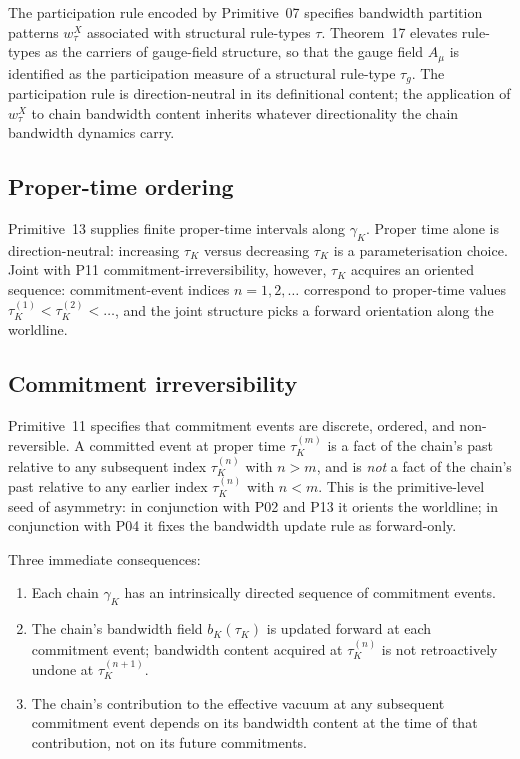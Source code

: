 \documentclass[11pt,a4paper]{article}
\begin{document}
The participation rule encoded by Primitive~07 specifies bandwidth partition patterns $w_\tau^X$ associated with structural rule-types $\tau$. Theorem~17 elevates rule-types as the carriers of gauge-field structure, so that the gauge field $A_\mu$ is identified as the participation measure of a structural rule-type $\tau_g$. The participation rule is direction-neutral in its definitional content; the application of $w_\tau^X$ to chain bandwidth content inherits whatever directionality the chain bandwidth dynamics carry.

\subsection{Proper-time ordering}

Primitive~13 supplies finite proper-time intervals along $\gamma_K$. Proper time alone is direction-neutral: increasing $\tau_K$ versus decreasing $\tau_K$ is a parameterisation choice. Joint with P11 commitment-irreversibility, however, $\tau_K$ acquires an oriented sequence: commitment-event indices $n = 1, 2, \ldots$ correspond to proper-time values $\tau_K^{(1)} < \tau_K^{(2)} < \ldots$, and the joint structure picks a forward orientation along the worldline.

\subsection{Commitment irreversibility}

Primitive~11 specifies that commitment events are discrete, ordered, and non-reversible. A committed event at proper time $\tau_K^{(m)}$ is a fact of the chain's past relative to any subsequent index $\tau_K^{(n)}$ with $n > m$, and is \emph{not} a fact of the chain's past relative to any earlier index $\tau_K^{(n)}$ with $n < m$. This is the primitive-level seed of asymmetry: in conjunction with P02 and P13 it orients the worldline; in conjunction with P04 it fixes the bandwidth update rule as forward-only.

Three immediate consequences:
\begin{enumerate}[leftmargin=1.5em]
  \item Each chain $\gamma_K$ has an intrinsically directed sequence of commitment events.
  \item The chain's bandwidth field $b_K(\tau_K)$ is updated forward at each commitment event; bandwidth content acquired at $\tau_K^{(n)}$ is not retroactively undone at $\tau_K^{(n+1)}$.
  \item The chain's contribution to the effective vacuum at any subsequent commitment event depends on its bandwidth content at the time of that contribution, not on its future commitments.
\end{enumerate}
\end{document}
